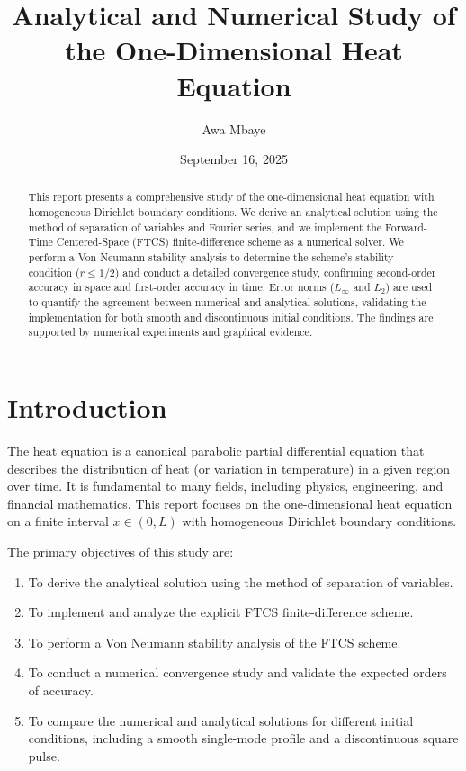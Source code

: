 \documentclass[11pt, a4paper]{article}
\title{\textbf{Analytical and Numerical Study of the One-Dimensional Heat Equation}}
\author{Awa Mbaye}
\date{September 16, 2025}
\begin{document}
\maketitle

\begin{abstract}
This report presents a comprehensive study of the one-dimensional heat equation with homogeneous Dirichlet boundary conditions. We derive an analytical solution using the method of separation of variables and Fourier series, and we implement the Forward-Time Centered-Space (FTCS) finite-difference scheme as a numerical solver. We perform a Von Neumann stability analysis to determine the scheme's stability condition ($r \leq 1/2$) and conduct a detailed convergence study, confirming second-order accuracy in space and first-order accuracy in time. Error norms ($L_\infty$ and $L_2$) are used to quantify the agreement between numerical and analytical solutions, validating the implementation for both smooth and discontinuous initial conditions. The findings are supported by numerical experiments and graphical evidence.
\end{abstract}

\newpage
\tableofcontents
\newpage

\section{Introduction}

The heat equation is a canonical parabolic partial differential equation that describes the distribution of heat (or variation in temperature) in a given region over time. It is fundamental to many fields, including physics, engineering, and financial mathematics. This report focuses on the one-dimensional heat equation on a finite interval $x \in (0, L)$ with homogeneous Dirichlet boundary conditions.

The primary objectives of this study are:
\begin{enumerate}
    \item To derive the analytical solution using the method of separation of variables.
    \item To implement and analyze the explicit FTCS finite-difference scheme.
    \item To perform a Von Neumann stability analysis of the FTCS scheme.
    \item To conduct a numerical convergence study and validate the expected orders of accuracy.
    \item To compare the numerical and analytical solutions for different initial conditions, including a smooth single-mode profile and a discontinuous square pulse.
\end{enumerate}
\end{document}
